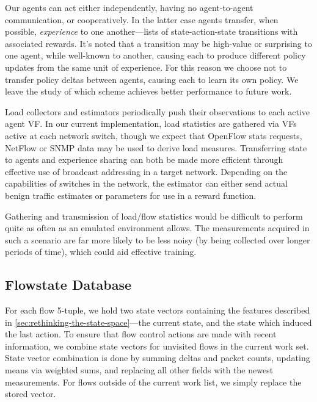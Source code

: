 \documentclass[10pt, times, conference, letterpaper]{IEEEtran}
\begin{document}
Our agents can act either independently, having no agent-to-agent communication, or cooperatively.
In the latter case agents transfer, when possible, \emph{experience} to one another---lists of state-action-state transitions with associated rewards.
It's noted that a transition may be high-value or surprising to one agent, while well-known to another, causing each to produce different policy updates from the same unit of experience.
For this reason we choose not to transfer policy deltas between agents, causing each to learn its own policy.
We leave the study of which scheme achieves better performance to future work.

Load collectors and estimators periodically push their observations to each active agent VF.
In our current implementation, load statistics are gathered via VFs active at each network switch, though we expect that OpenFlow stats requests, NetFlow or SNMP data may be used to derive load measures.
Transferring state to agents and experience sharing can both be made more efficient through effective use of broadcast addressing in a target network.
Depending on the capabilities of switches in the network, the estimator can either send actual benign traffic estimates or parameters for use in a reward function.

Gathering and transmission of load/flow statistics would be difficult to perform quite as often as an emulated environment allows.
The measurements acquired in such a scenario are far more likely to be less noisy (by being collected over longer periods of time), which could aid effective training.

\subsection{Flowstate Database}
For each flow 5-tuple, we hold two state vectors containing the features described in \cref{sec:rethinking-the-state-space}---the current state, and the state which induced the last action.
To ensure that flow control actions are made with recent information, we combine state vectors for unvisited flows in the current work set.
State vector combination is done by summing deltas and packet counts, updating means via weighted sums, and replacing all other fields with the newest measurements.
For flows outside of the current work list, we simply replace the stored vector.
\end{document}
